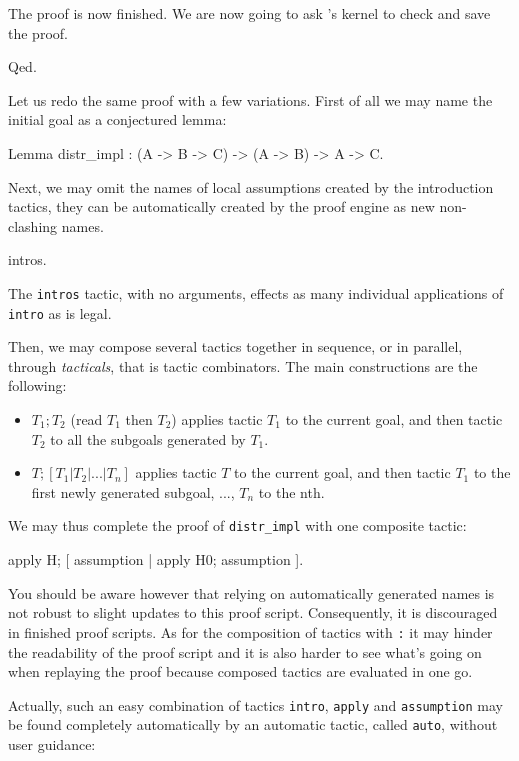 \documentclass[11pt,a4paper]{book}
\begin{document}
The proof is now finished. We are now going to ask \Coq{}'s kernel
to check and save the proof.
\begin{coq_example}
Qed.
\end{coq_example}

Let us redo the same proof with a few variations. First of all we may name
the initial goal as a conjectured lemma:
\begin{coq_example}
Lemma distr_impl : (A -> B -> C) -> (A -> B) -> A -> C.
\end{coq_example}

Next, we may omit the names of local assumptions created by the introduction
tactics, they can be automatically created by the proof engine as new
non-clashing names.
\begin{coq_example}
intros.
\end{coq_example}

The \verb:intros: tactic, with no arguments, effects as many individual
applications of \verb:intro: as is legal.

Then, we may compose several tactics together in sequence, or in parallel,
through {\sl tacticals}, that is tactic combinators. The main constructions
are the following:
\begin{itemize}
\item $T_1 ; T_2$ (read $T_1$ then $T_2$) applies tactic $T_1$ to the current
goal, and then tactic $T_2$ to all the subgoals generated by $T_1$.
\item $T; [T_1 | T_2 | ... | T_n]$ applies tactic $T$ to the current
goal, and then tactic $T_1$ to the first newly generated subgoal,
..., $T_n$ to the nth.
\end{itemize}

We may thus complete the proof of \verb:distr_impl: with one composite tactic:
\begin{coq_example}
apply H; [ assumption | apply H0; assumption ].
\end{coq_example}

You should be aware however that relying on automatically generated names is
not robust to slight updates to this proof script. Consequently, it is
discouraged in finished proof scripts. As for the composition of tactics with
\texttt{:} it may hinder the readability of the proof script and it is also
harder to see what's going on when replaying the proof because composed
tactics are evaluated in one go.

Actually, such an easy combination of tactics \verb:intro:, \verb:apply:
and \verb:assumption: may be found completely automatically by an automatic
tactic, called \verb:auto:, without user guidance:
\end{document}
